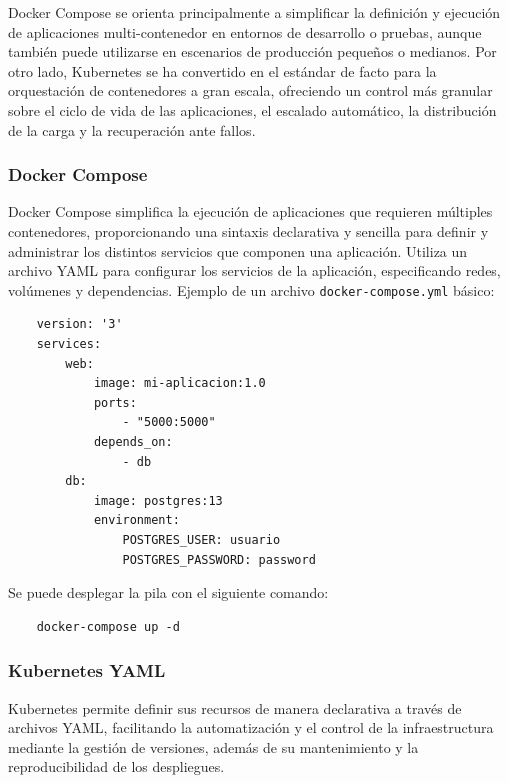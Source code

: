 {                Docker Compose se orienta principalmente a simplificar la definición y ejecución de aplicaciones multi-contenedor en entornos de desarrollo o pruebas, aunque también puede utilizarse en escenarios de producción pequeños o medianos. Por otro lado, Kubernetes se ha convertido en el estándar de facto para la orquestación de contenedores a gran escala, ofreciendo un control más granular sobre el ciclo de vida de las aplicaciones, el escalado automático, la distribución de la carga y la recuperación ante fallos.

            \subsubsection{Docker Compose}
                Docker Compose simplifica la ejecución de aplicaciones que requieren múltiples contenedores, proporcionando una sintaxis declarativa y sencilla para definir y administrar los distintos servicios que componen una aplicación. Utiliza un archivo YAML para configurar los servicios de la aplicación, especificando redes, volúmenes y dependencias. Ejemplo de un archivo \texttt{docker-compose.yml} básico:
            
                \begin{verbatim}
    version: '3'
    services:
        web:
            image: mi-aplicacion:1.0
            ports:
                - "5000:5000"
            depends_on:
                - db
        db:
            image: postgres:13
            environment:
                POSTGRES_USER: usuario
                POSTGRES_PASSWORD: password
                \end{verbatim}
                
                Se puede desplegar la pila con el siguiente comando:
                
                \begin{verbatim}
    docker-compose up -d
                \end{verbatim}
            
            \subsubsection{Kubernetes YAML}
                Kubernetes permite definir sus recursos de manera declarativa a través de archivos YAML, facilitando la automatización y el control de la infraestructura mediante la gestión de versiones, además de su mantenimiento y la reproducibilidad de los despliegues.
                
}

